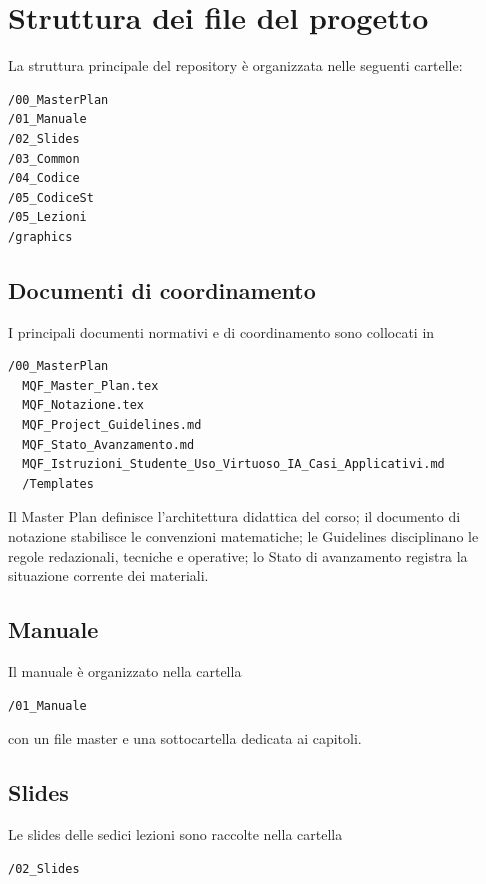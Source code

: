 \documentclass[12pt,a4paper]{article}%
\newcommand{\1}{\mathbf{1}}
\begin{document}
\section{Struttura dei file del progetto}

La struttura principale del repository \`{e} organizzata nelle seguenti
cartelle:

\begin{verbatim}
/00_MasterPlan
/01_Manuale
/02_Slides
/03_Common
/04_Codice
/05_CodiceSt
/05_Lezioni
/graphics
\end{verbatim}

\subsection{Documenti di coordinamento}

I principali documenti normativi e di coordinamento sono collocati in

\begin{verbatim}
/00_MasterPlan
  MQF_Master_Plan.tex
  MQF_Notazione.tex
  MQF_Project_Guidelines.md
  MQF_Stato_Avanzamento.md
  MQF_Istruzioni_Studente_Uso_Virtuoso_IA_Casi_Applicativi.md
  /Templates
\end{verbatim}

Il Master Plan definisce l'architettura didattica del corso; il documento di
notazione stabilisce le convenzioni matematiche; le Guidelines disciplinano
le regole redazionali, tecniche e operative; lo Stato di avanzamento registra
la situazione corrente dei materiali.

\subsection{Manuale}

Il manuale \`{e} organizzato nella cartella

\begin{verbatim}
/01_Manuale
\end{verbatim}

con un file master e una sottocartella dedicata ai capitoli.

\subsection{Slides}

Le slides delle sedici lezioni sono raccolte nella cartella

\begin{verbatim}
/02_Slides
\end{verbatim}
\end{document}
